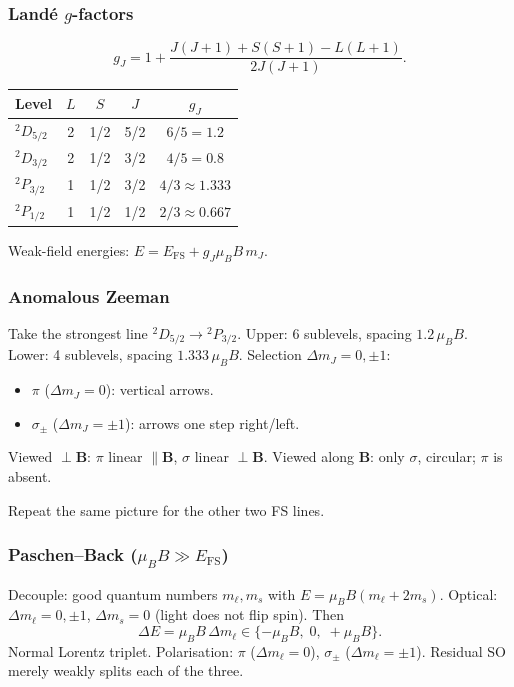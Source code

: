 \documentclass[11pt,a4paper]{article}
\begin{document}
\subsubsection*{Land\'e \(g\)-factors}
\[
g_J=1+\frac{J(J+1)+S(S+1)-L(L+1)}{2J(J+1)}.
\]
\begin{center}
\begin{tabular}{@{}lcccc@{}}
\toprule
Level & \(L\) & \(S\) & \(J\) & \(g_J\) \\
\midrule
\({}^2D_{5/2}\) & 2 & 1/2 & 5/2 & \(6/5=1.2\) \\
\({}^2D_{3/2}\) & 2 & 1/2 & 3/2 & \(4/5=0.8\) \\
\({}^2P_{3/2}\) & 1 & 1/2 & 3/2 & \(4/3\approx 1.333\) \\
\({}^2P_{1/2}\) & 1 & 1/2 & 1/2 & \(2/3\approx 0.667\) \\
\bottomrule
\end{tabular}
\end{center}
Weak-field energies: \(E=E_{\mathrm{FS}}+g_J\mu_B B\, m_J\).

\subsubsection*{Anomalous Zeeman}
Take the strongest line \({}^2D_{5/2}\to{}^2P_{3/2}\).
Upper: 6 sublevels, spacing \(1.2\,\mu_B B\). Lower: 4 sublevels, spacing \(1.333\,\mu_B B\).
Selection \(\Delta m_J=0,\pm 1\):
\begin{itemize}
\item \(\pi\) (\(\Delta m_J=0\)): vertical arrows.
\item \(\sigma_\pm\) (\(\Delta m_J=\pm 1\)): arrows one step right/left.
\end{itemize}
Viewed \(\perp\mathbf{B}\): \(\pi\) linear \(\parallel\mathbf{B}\), \(\sigma\) linear \(\perp\mathbf{B}\).
Viewed along \(\mathbf{B}\): only \(\sigma\), circular; \(\pi\) is absent.

Repeat the same picture for the other two FS lines.

\subsubsection*{Paschen--Back (\(\mu_B B\gg E_{\mathrm{FS}}\))}
Decouple: good quantum numbers \(m_\ell,m_s\) with \(E=\mu_B B(m_\ell+2m_s)\).
Optical: \(\Delta m_\ell=0,\pm 1\), \(\Delta m_s=0\) (light does not flip spin). Then
\[
\Delta E=\mu_B B\,\Delta m_\ell \in \{-\mu_B B,\;0,\;+\mu_B B\}.
\]
Normal Lorentz triplet. Polarisation: \(\pi\) (\(\Delta m_\ell=0\)), \(\sigma_\pm\) (\(\Delta m_\ell=\pm 1\)). Residual SO merely weakly splits each of the three.
\end{document}
